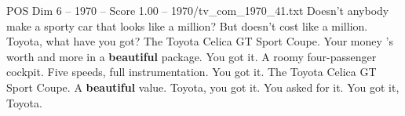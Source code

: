 \begin{textsample}{POS Dim 6 – 1970 – Score 1.00 – 1970/tv\_com\_1970\_41.txt}  \label{ex:f6_pos_036}
Doesn't anybody make a sporty car that looks like a million?
But doesn't cost like a million.
Toyota, what have you got?
The Toyota Celica GT Sport Coupe.
Your money 's worth and more in a \textbf{beautiful} package.
You got it.
A roomy four-passenger cockpit.
Five speeds, full instrumentation.
You got it.
The Toyota Celica GT Sport Coupe.
A \textbf{beautiful} value.
Toyota, you got it.
You asked for it.
You got it, Toyota.

\end{textsample}
